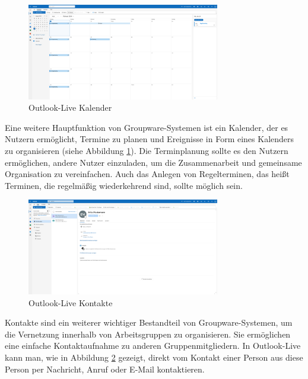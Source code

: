 \begin{figure}[H]
    \centering
    \includegraphics[width=0.75\textwidth]{images/OutlookLive_Calender1.png}
    \caption{Outlook-Live Kalender}
    \label{fig:outlook-live-calender}
\end{figure}

Eine weitere Hauptfunktion von Groupware-Systemen ist ein Kalender, der es Nutzern ermöglicht, Termine zu planen und Ereignisse in Form eines Kalenders zu organisieren (siehe Abbildung \ref{fig:outlook-live-calender}).
Die Terminplanung sollte es den Nutzern ermöglichen, andere Nutzer einzuladen, um die Zusammenarbeit und gemeinsame Organisation zu vereinfachen.
Auch das Anlegen von Regelterminen, das heißt Terminen, die regelmäßig wiederkehrend sind, sollte möglich sein.

\begin{figure}[H]
    \centering
    \includegraphics[width=0.75\textwidth]{images/OutlookLive_Contacts.png}
    \caption{Outlook-Live Kontakte}
    \label{fig:outlook-live-contacts}
\end{figure}

Kontakte sind ein weiterer wichtiger Bestandteil von Groupware-Systemen, um die Vernetzung innerhalb von Arbeitsgruppen zu organisieren.
Sie ermöglichen eine einfache Kontaktaufnahme zu anderen Gruppenmitgliedern.
In Outlook-Live kann man, wie in Abbildung \ref{fig:outlook-live-contacts} gezeigt, direkt vom Kontakt einer Person aus diese Person per Nachricht, Anruf oder E-Mail kontaktieren.


